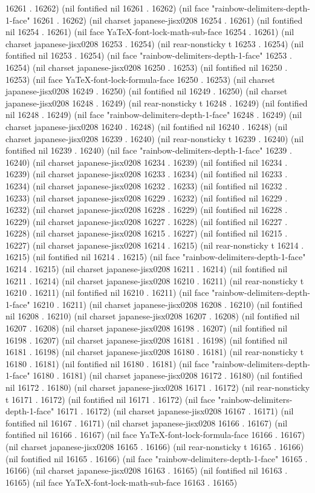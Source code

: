 16261 . 16262) (nil fontified nil 16261 . 16262) (nil face "rainbow-delimiters-depth-1-face" 16261 . 16262) (nil charset japanese-jisx0208 16254 . 16261) (nil fontified nil 16254 . 16261) (nil face YaTeX-font-lock-math-sub-face 16254 . 16261) (nil charset japanese-jisx0208 16253 . 16254) (nil rear-nonsticky t 16253 . 16254) (nil fontified nil 16253 . 16254) (nil face "rainbow-delimiters-depth-1-face" 16253 . 16254) (nil charset japanese-jisx0208 16250 . 16253) (nil fontified nil 16250 . 16253) (nil face YaTeX-font-lock-formula-face 16250 . 16253) (nil charset japanese-jisx0208 16249 . 16250) (nil fontified nil 16249 . 16250) (nil charset japanese-jisx0208 16248 . 16249) (nil rear-nonsticky t 16248 . 16249) (nil fontified nil 16248 . 16249) (nil face "rainbow-delimiters-depth-1-face" 16248 . 16249) (nil charset japanese-jisx0208 16240 . 16248) (nil fontified nil 16240 . 16248) (nil charset japanese-jisx0208 16239 . 16240) (nil rear-nonsticky t 16239 . 16240) (nil fontified nil 16239 . 16240) (nil face "rainbow-delimiters-depth-1-face" 16239 . 16240) (nil charset japanese-jisx0208 16234 . 16239) (nil fontified nil 16234 . 16239) (nil charset japanese-jisx0208 16233 . 16234) (nil fontified nil 16233 . 16234) (nil charset japanese-jisx0208 16232 . 16233) (nil fontified nil 16232 . 16233) (nil charset japanese-jisx0208 16229 . 16232) (nil fontified nil 16229 . 16232) (nil charset japanese-jisx0208 16228 . 16229) (nil fontified nil 16228 . 16229) (nil charset japanese-jisx0208 16227 . 16228) (nil fontified nil 16227 . 16228) (nil charset japanese-jisx0208 16215 . 16227) (nil fontified nil 16215 . 16227) (nil charset japanese-jisx0208 16214 . 16215) (nil rear-nonsticky t 16214 . 16215) (nil fontified nil 16214 . 16215) (nil face "rainbow-delimiters-depth-1-face" 16214 . 16215) (nil charset japanese-jisx0208 16211 . 16214) (nil fontified nil 16211 . 16214) (nil charset japanese-jisx0208 16210 . 16211) (nil rear-nonsticky t 16210 . 16211) (nil fontified nil 16210 . 16211) (nil face "rainbow-delimiters-depth-1-face" 16210 . 16211) (nil charset japanese-jisx0208 16208 . 16210) (nil fontified nil 16208 . 16210) (nil charset japanese-jisx0208 16207 . 16208) (nil fontified nil 16207 . 16208) (nil charset japanese-jisx0208 16198 . 16207) (nil fontified nil 16198 . 16207) (nil charset japanese-jisx0208 16181 . 16198) (nil fontified nil 16181 . 16198) (nil charset japanese-jisx0208 16180 . 16181) (nil rear-nonsticky t 16180 . 16181) (nil fontified nil 16180 . 16181) (nil face "rainbow-delimiters-depth-1-face" 16180 . 16181) (nil charset japanese-jisx0208 16172 . 16180) (nil fontified nil 16172 . 16180) (nil charset japanese-jisx0208 16171 . 16172) (nil rear-nonsticky t 16171 . 16172) (nil fontified nil 16171 . 16172) (nil face "rainbow-delimiters-depth-1-face" 16171 . 16172) (nil charset japanese-jisx0208 16167 . 16171) (nil fontified nil 16167 . 16171) (nil charset japanese-jisx0208 16166 . 16167) (nil fontified nil 16166 . 16167) (nil face YaTeX-font-lock-formula-face 16166 . 16167) (nil charset japanese-jisx0208 16165 . 16166) (nil rear-nonsticky t 16165 . 16166) (nil fontified nil 16165 . 16166) (nil face "rainbow-delimiters-depth-1-face" 16165 . 16166) (nil charset japanese-jisx0208 16163 . 16165) (nil fontified nil 16163 . 16165) (nil face YaTeX-font-lock-math-sub-face 16163 . 16165) 